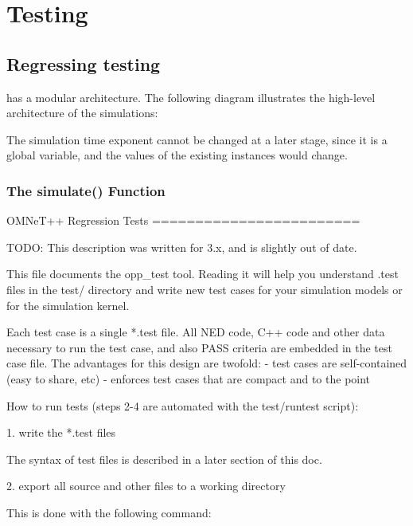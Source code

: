 \chapter{Testing}
\label{cha:testing}

\section{Regressing testing}

{\opp} has a modular architecture. The following diagram illustrates  the
high-level architecture of the {\opp} simulations:

\begin{note}
The simulation time exponent cannot be changed at a later stage, since it is
a global variable, and the values of the existing  instances
would change.
\end{note}

\subsection{The simulate() Function}

OMNeT++ Regression Tests
========================

TODO: This description was written for 3.x, and is slightly out of date.


This file documents the opp\_test tool. Reading it will help you understand
.test files in the test/ directory and write new test cases for your simulation
models or for the simulation kernel.


Each test case is a single *.test file. All NED code, C++ code and
other data necessary to run the test case, and also PASS criteria are
embedded in the test case file. The advantages for this design are twofold:
 - test cases are self-contained (easy to share, etc)
 - enforces test cases that are compact and to the point

How to run tests (steps 2-4 are automated with the test/runtest script):

1. write the *.test files

  The syntax of test files is described in a later section of this doc.

2. export all source and other files to a working directory

  This is done with the following command:

\begin{filelisting}
\end{filelisting}

